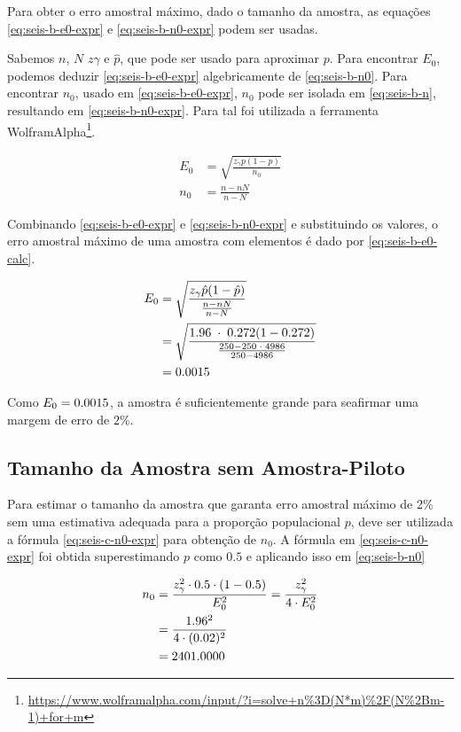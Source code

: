 	Para obter o erro amostral máximo, dado o tamanho da amostra, as equações
	\eqref{eq:seis-b-e0-expr} e \eqref{eq:seis-b-n0-expr} podem ser usadas. 

	Sabemos $n$, $N$ $z\gamma$ e $\hat{p}$, que pode ser usado para aproximar
	$p$. Para encontrar $E_0$, podemos deduzir \eqref{eq:seis-b-e0-expr}
	algebricamente de \eqref{eq:seis-b-n0}. Para encontrar $n_0$, usado em
	\eqref{eq:seis-b-e0-expr}, $n_0$ pode ser isolada em
	\eqref{eq:seis-b-n}, resultando em \eqref{eq:seis-b-n0-expr}. Para tal
	foi utilizada a ferramenta
	WolframAlpha\footnote{\url{https://www.wolframalpha.com/input/?i=solve+n\%3D(N*m)\%2F(N\%2Bm-1)+for+m}}.

	\begin{align}
		E_0 &= \label{eq:seis-b-e0-expr}
			   \sqrt{\frac{z_\gamma p(1 - p) }{n_0}} \\
		n_0 &= \label{eq:seis-b-n0-expr}
			   \frac{n-n N}{n-N}
	\end{align}

	Combinando \eqref{eq:seis-b-e0-expr} e \eqref{eq:seis-b-n0-expr} e
	substituindo os valores, o erro amostral máximo de uma amostra com
	\SEISn elementos é dado por \eqref{eq:seis-b-e0-calc}.

	\begin{align}
		\label{eq:seis-b-e0-calc}
		E_0 &= \sqrt{\frac{z_\gamma \hat{p}(1 - \hat{p}) }{\frac{n-n N}{n - N}}} \\
			&= \sqrt{\frac{1.96 \;\cdot\; 0.272 (1 - 0.272) }{\frac{250 - 250 \;\cdot\; 4986}{250 - 4986}}} \nonumber \\
			&= 0.0015 \nonumber
	\end{align}

	Como $E_0 = 0.0015$, a amostra é suficientemente grande para seafirmar
	uma margem de erro de $2\%$.

\subsection{Tamanho da Amostra sem Amostra-Piloto}

	Para estimar o tamanho da amostra que garanta erro amostral máximo de 2\%
	sem uma estimativa adequada para a proporção populacional $p$, deve ser
	utilizada a fórmula \eqref{eq:seis-c-n0-expr} para obtenção de $n_0$. A
	fórmula em \eqref{eq:seis-c-n0-expr} foi obtida superestimando $p$ como
	$0.5$ e aplicando isso em \eqref{eq:seis-b-n0}

	\begin{align}
		n_0 &= \label{eq:seis-c-n0-expr}
			   \frac{z_\gamma^2 \cdot 0.5 \cdot (1 - 0.5)}{E_0^2} = \frac{z_\gamma^2}{4 \cdot E_0^2} \\
			&= \frac{1.96^2}{4 \cdot (0.02)^2} \nonumber \\
			&= \label{eq:seis-c-n0-result}
			   2401.0000
	\end{align}

